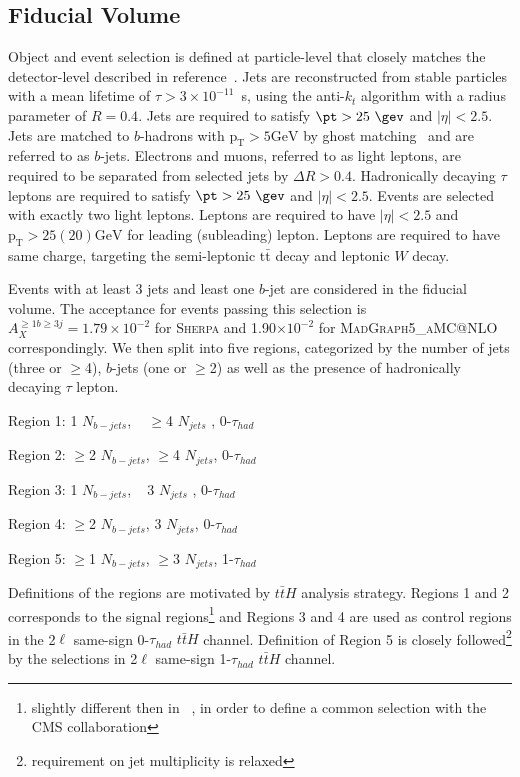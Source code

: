 
\subsection{Fiducial Volume}
Object and event selection is defined at particle-level that closely matches the detector-level described in reference~\cite{ATLAS-CONF-2019-045}. 
Jets are reconstructed from stable particles with a mean lifetime of $\tau > 3\times 10^{-11}$~s, using the anti-$k_t$ algorithm with a radius parameter of $R=0.4$.
Jets are required to satisfy $\pt > 25~\gev$ and $|\eta| < 2.5$.
Jets are matched to $b$-hadrons with $\mathrm{p_{T}>5 GeV}$ by ghost matching~\cite{Cacciari:2008gn} and are referred to as $b$-jets. 
Electrons and muons, referred to as light leptons, are required to be separated from selected jets by $\Delta R>0.4$. 
Hadronically decaying $\tau$ leptons are required to satisfy $\pt > 25~\gev$ and $|\eta| < 2.5$.
Events are selected with exactly two light leptons.
Leptons are required to have $|\eta|< 2.5$ and $\mathrm{p_{T}>25(20) GeV}$ for leading (subleading) lepton. 
Leptons are required to have same charge, targeting the semi-leptonic $\mathrm{t\bar{t}}$ decay and leptonic $W$ decay.

Events with at least 3 jets and least one $b$-jet are considered in the fiducial volume. 
The acceptance for events passing this selection is $A_X^{\geq1b\geq3j}=1.79\times10^{-2}$ for \textsc{Sherpa} and 1.90$\times10^{-2}$ for \textsc{MadGraph5\_aMC@NLO} correspondingly.
We then split into five regions, categorized by the number of jets (three or  $\geq$4), $b$-jets (one or $\geq$2) as well as the presence of hadronically decaying $\tau$ lepton. 
				\begin{description}
				\item Region 1: 1 $N_{b-jets}$, ~ $\geq$4 $N_{jets}$ , 0-$\tau_{had}$
				\item Region 2: $\geq$2 $N_{b-jets}$,   $\geq$4 $N_{jets}$, 0-$\tau_{had}$
				\item Region 3: 1 $N_{b-jets}$, ~  3 $N_{jets}$ , 0-$\tau_{had}$
				\item Region 4: $\geq$2 $N_{b-jets}$, 3 $N_{jets}$, 0-$\tau_{had}$
				\item Region 5: $\geq$1 $N_{b-jets}$, $\geq$3 $N_{jets}$, 1-$\tau_{had}$
				\end{description}
Definitions of the regions are motivated by $t\bar{t}H$ analysis strategy.
Regions 1 and 2 corresponds to the signal regions\footnote{slightly different then in ~\cite{ATLAS-CONF-2019-045}, in order to define a common selection with the CMS collaboration} and Regions 3 and 4 are used as control regions in the 2$\ell$ same-sign  0-$\tau_{had}$ $t\bar{t}H$ channel.
Definition of Region 5 is closely followed\footnote{requirement on jet multiplicity is relaxed} by the selections in 2$\ell$ same-sign 1-$\tau_{had}$ $t\bar{t}H$ channel.

